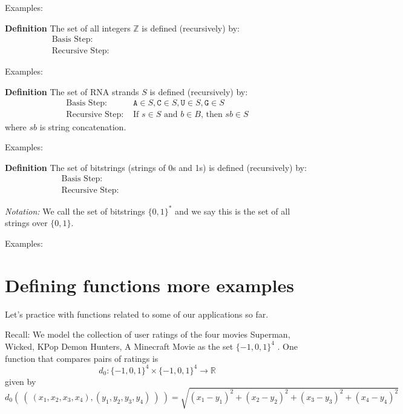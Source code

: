 \documentclass[12pt, oneside]{article}
\newcommand{\A}[0]{\texttt{A}}
\newcommand{\C}[0]{\texttt{C}}
\newcommand{\G}[0]{\texttt{G}}
\newcommand{\U}[0]{\texttt{U}}
\begin{document}
Examples: 

{\bf Definition} The set of all integers $\mathbb{Z}$ is defined (recursively) by: 
\[
\begin{array}{ll}
\textrm{Basis Step: } & \phantom{0 \in \mathbb{Z}} \\
\textrm{Recursive Step: } & \phantom{\textrm{If } x \in \mathbb{Z} \textrm{, then } x+1 \in \mathbb{Z}
\textrm{ and } x-1 \in \mathbb{Z}}
\end{array}
\]

Examples: 

\vfill

{\bf Definition} The set of RNA strands $S$ is defined (recursively) by:
\[
\begin{array}{ll}
\textrm{Basis Step: } & \A \in S, \C \in S, \U \in S, \G \in S \\
\textrm{Recursive Step: } & \textrm{If } s \in S\textrm{ and }b \in B \textrm{, then }sb \in S
\end{array}
\]
where $sb$ is string concatenation.

Examples: 

\vfill

{\bf Definition} The set of bitstrings (strings of 0s and 1s) is defined (recursively) by:
\[
\begin{array}{ll}
\textrm{Basis Step: } & \phantom{\lambda \in X} \\
\textrm{Recursive Step: } & \phantom{\textrm{If } s \in X \textrm{, then } s0 \in X \text{ and } s1 \in X}
\end{array}
\]

{\it Notation:} We call the set of bitstrings $\{0,1\}^*$ and we say 
this is the set of all strings over $\{0,1\}$.

Examples: 

\vfill \vfill
\section*{Defining functions more examples}


Let's practice with functions related to some of our applications so far.

Recall: We model the collection of user ratings of the four movies Superman, Wicked, KPop Demon Hunters, A Minecraft Movie as the set
$\{-1,0,1\}^4$ . One function that compares pairs of ratings is
$$d_0: \{-1,0,1\}^4 \times \{-1,0,1\}^4 \to \mathbb{R}$$
given by
\[
d_0 (~(~ (x_1, x_2, x_3, x_4), (y_1, y_2, y_3, y_4) ~) ~) = \sqrt{ (x_1 - y_1)^2 + (x_2 - y_2)^2 + (x_3 -y_3)^2 + (x_4 -y_4)^2}
\]
\end{document}
